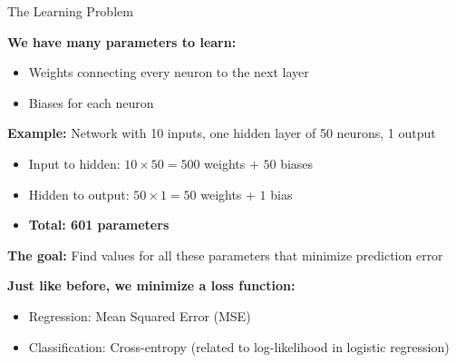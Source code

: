 \documentclass[10pt]{beamer}
\begin{document}
\begin{frame}{The Learning Problem}

  \textbf{We have many parameters to learn:}
  \begin{itemize}
    \item Weights connecting every neuron to the next layer
    \item Biases for each neuron
  \end{itemize}

  \vspace{0.5em}
  \textbf{Example:} Network with 10 inputs, one hidden layer of 50 neurons, 1 output
  \begin{itemize}
    \item Input to hidden: $10 \times 50 = 500$ weights + $50$ biases
    \item Hidden to output: $50 \times 1 = 50$ weights + $1$ bias
    \item \textbf{Total: 601 parameters}
  \end{itemize}

  \vspace{1em}
  \textbf{The goal:} Find values for all these parameters that minimize prediction error

  \vspace{0.5em}
  \textbf{Just like before, we minimize a loss function:}
  \begin{itemize}
    \item Regression: Mean Squared Error (MSE)
    \item Classification: Cross-entropy (related to log-likelihood in logistic regression)
  \end{itemize}
\end{frame}

\end{document}

